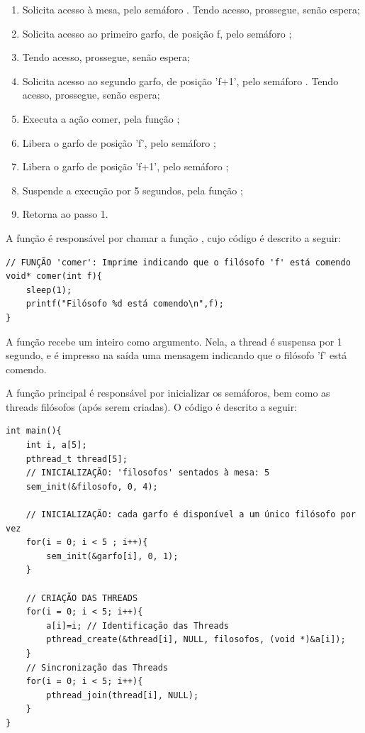 \documentclass[
	12pt,				%
	openright,			%
	oneside,			%
	a4paper,			%
	chapter=TITLE,		%
	english,			%
	french,				%
	spanish,			%
	brazil				%
	]{abntex2}
\theoremstyle{definition}
\begin{document}
\begin{enumerate}
    \item Solicita acesso à mesa, pelo semáforo . Tendo acesso, prossegue, senão espera;
    \item Solicita acesso ao primeiro garfo, de posição f, pelo semáforo ;
    \item Tendo acesso, prossegue, senão espera;
    \item Solicita acesso ao segundo garfo, de posição 'f+1', pelo semáforo . Tendo acesso, prossegue, senão espera;
    \item Executa a ação comer, pela função ;
    \item Libera o garfo de posição 'f', pelo semáforo ;
    \item Libera o garfo de posição 'f+1', pelo semáforo ;
    \item Suspende a execução por 5 segundos, pela função ;
    \item Retorna ao passo 1.
\end{enumerate}
A função  é responsável por chamar a função , cujo código é descrito a seguir:

\begin{verbatim}
// FUNÇÃO 'comer': Imprime indicando que o filósofo 'f' está comendo
void* comer(int f){
    sleep(1);
    printf("Filósofo %d está comendo\n",f);
}
\end{verbatim}

A função  recebe um inteiro  como argumento. Nela, a thread é suspensa por 1 segundo, e é impresso na saída uma mensagem indicando que o filósofo 'f' está comendo.

A função principal  é responsável por inicializar os semáforos, bem como as threads filósofos (após serem criadas). O código é descrito a seguir:

\begin{verbatim}
int main(){
    int i, a[5];
    pthread_t thread[5];
    // INICIALIZAÇÃO: 'filosofos' sentados à mesa: 5
    sem_init(&filosofo, 0, 4);

    // INICIALIZAÇÃO: cada garfo é disponível a um único filósofo por vez
    for(i = 0; i < 5 ; i++){
        sem_init(&garfo[i], 0, 1); 
    }

    // CRIAÇÃO DAS THREADS
    for(i = 0; i < 5; i++){
        a[i]=i; // Identificação das Threads
        pthread_create(&thread[i], NULL, filosofos, (void *)&a[i]);
    }
    // Sincronização das Threads
    for(i = 0; i < 5; i++){
        pthread_join(thread[i], NULL);
    }
}
\end{verbatim}
\end{document}
